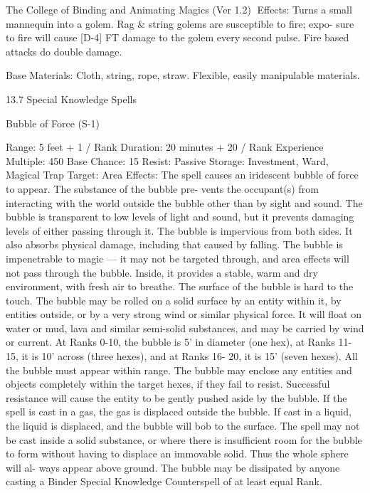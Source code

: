 \begin{Chapter}{The College of Binding and Animating Magics (Ver 1.2)}
Effects:  Turns  a  small  mannequin  into  a  golem. 
Rag  \&  string  golems are  susceptible  to  fire;  expo-
sure  to  fire  will  cause  [D-4]  FT  damage  to  the 
golem  every  second  pulse.  Fire  based  attacks  do 
double damage. 

Base Materials: Cloth, string, rope, straw. Flexible, 
easily manipulable materials. 

13.7 Special Knowledge Spells 

Bubble of Force (S-1) 

Range: 5 feet + 1 / Rank 
Duration: 20 minutes + 20 / Rank 
Experience Multiple: 450 
Base Chance: 15%
Resist: Passive 
Storage: Investment, Ward, Magical Trap 
Target: Area 
Effects:  The  spell  causes  an  iridescent  bubble  of 
force  to  appear.  The  substance  of  the  bubble  pre-
vents  the  occupant(s)  from  interacting  with  the 
world  outside  the  bubble  other  than  by  sight  and 
sound.  The  bubble  is  transparent  to  low  levels  of 
light and sound, but it prevents damaging levels of 
either passing through it. The bubble is impervious 
from  both  sides.  It  also  absorbs  physical  damage, 
including  that  caused  by  falling.  The  bubble  is 
impenetrable  to  magic  —  it  may  not  be  targeted 
through, and area effects  will not pass through the 
bubble.  Inside,  it  provides  a  stable,  warm  and  dry 
environment, with fresh air to breathe. The surface 
of the bubble is hard to the touch. The bubble may 
be  rolled  on  a  solid  surface  by  an  entity  within  it, 
by  entities  outside,  or  by  a  very  strong  wind  or 
similar  physical  force.  It  will  float  on  water  or 
mud,  lava  and  similar  semi-solid  substances,  and 
may be carried by wind or current. At Ranks 0-10, 
the bubble is 5’ in diameter (one hex), at Ranks 11-
15, it is 10’ across (three hexes), and at Ranks 16-
20,  it  is  15’  (seven  hexes).  All  the  bubble  must 
appear  within  range.  The  bubble  may  enclose  any 
entities  and  objects  completely  within  the  target 
hexes,  if  they  fail  to  resist.  Successful  resistance 
will  cause  the  entity  to  be  gently  pushed  aside  by 
the  bubble.  If  the  spell  is  cast  in  a  gas,  the  gas  is 
displaced outside the bubble. If cast in a liquid, the 
liquid  is  displaced,  and  the  bubble  will  bob  to  the 
surface.  The  spell  may  not  be  cast  inside  a  solid 
substance,  or  where  there  is  insufficient  room  for 
the  bubble  to  form  without  having  to  displace  an 
immovable  solid.  Thus  the  whole  sphere  will  al-
ways  appear  above  ground.  The  bubble  may  be 
dissipated  by  anyone  casting  a  Binder  Special 
Knowledge Counterspell of at least equal Rank. 


\end{Chapter}
